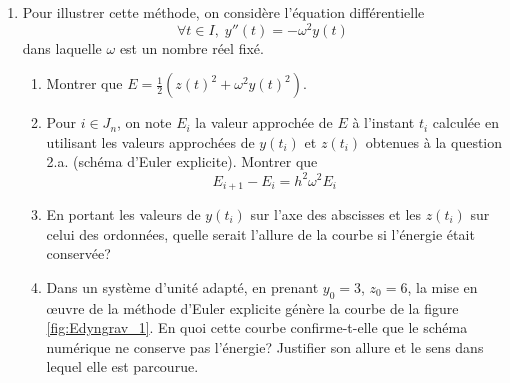 \begin{enumerate}
\item Pour illustrer cette méthode, on considère l'équation différentielle
\begin{displaymath}
  \forall t\in I,\; y''(t) = -\omega^2 y(t)
\end{displaymath}
dans laquelle $\omega$ est un nombre réel fixé.
\begin{enumerate}
  \item Montrer que $E=\frac{1}{2}\left( z(t)^2 + \omega^2 y(t)^2\right) $.
  \item Pour $i\in J_n$, on note $E_i$ la valeur approchée de $E$ à l'instant $t_i$ calculée en utilisant les valeurs approchées de $y(t_i)$ et $z(t_i)$ obtenues à la question 2.a. (schéma d'Euler explicite). Montrer que 
\begin{displaymath}
  E_{i+1} - E_i = h^2 \omega^2 E_i
\end{displaymath}
  \item En portant les valeurs de $y(t_i)$ sur l'axe des abscisses et les $z(t_i)$ sur celui des ordonnées, quelle serait l'allure de la courbe si l'énergie était conservée?
  \item Dans un système d'unité adapté,\label{misenoev} en prenant $y_0=3$, $z_0=6$, la mise en \oe{}uvre de la méthode d'Euler explicite génère la courbe de la figure \ref{fig:Edyngrav_1}. En quoi cette courbe confirme-t-elle que le schéma numérique ne conserve pas l'énergie? Justifier son allure et le sens dans lequel elle est parcourue.
\end{enumerate}


\end{enumerate}
